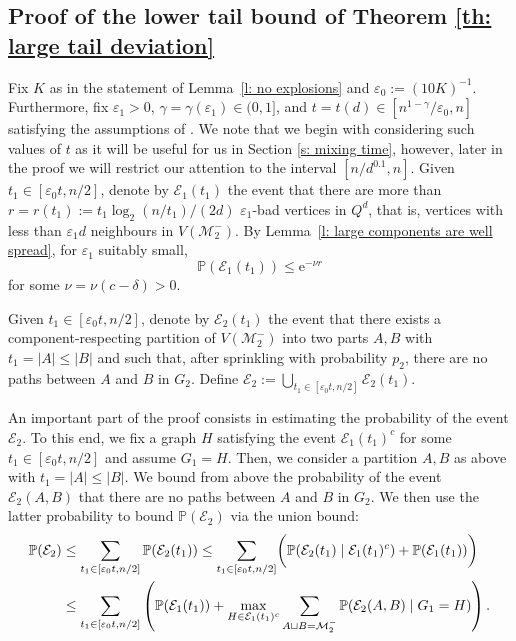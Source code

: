\documentclass[reqno,final,a4paper]{amsart}
\theoremstyle{definition}
\newcommand{\cE}{\mathcal{E}}
\newcommand{\cM}{\mathcal{M}}
\def\e{\mathrm{e}}
\def\eps{\varepsilon}
\newcommand{\1}{\mathbbm{1}}
\begin{document}
\subsection{Proof of the lower tail bound of Theorem \ref{th: large tail deviation}}\label{subsec: lower bound proof}
Fix $K$ as in the statement of Lemma~\ref{l: no explosions} and $\eps_0 := (10K)^{-1}$.
Furthermore, fix $\eps_1>0$, $\gamma=\gamma(\eps_1)\in (0,1]$, and $t=t(d)\in [n^{1-\gamma}/\eps_0,n]$ satisfying the assumptions of . We note that we begin with considering such values of $t$ as it will be useful for us in Section \ref{s: mixing time}, however, later in the proof we will restrict our attention to the interval $[n/d^{0.1},n]$.
Given $t_1\in [\varepsilon_0 t,n/2]$, denote by $\cE_1(t_1)$ the event that there are more than $r=r(t_1):=t_1 \log_2(n/t_1)/(2d)$ $\eps_1$-bad vertices in $Q^d$, that is, vertices with less than $\eps_1 d$ neighbours in $V(\cM_2^-)$.
By Lemma~\ref{l: large components are well spread}, for $\eps_1$ suitably small, 
\begin{equation}
\label{eq:E_1_t_1}
\mathbb P(\cE_1(t_1))\le \e^{-\nu r}
\end{equation}
for some $\nu=\nu(c-\delta)>0$.

Given $t_1\in [\varepsilon_0 t,n/2]$, denote by $\cE_2(t_1)$ the event that 
there exists a component-respecting partition of $V(\cM_2^-)$ into two parts $A,B$ with $t_1=|A|\le |B|$ and such that, 
after sprinkling with probability $p_2$, there are no paths between $A$ and $B$ in $G_2$. Define $\cE_2:=\bigcup_{t_1\in [\eps_0 t,n/2]} \cE_2(t_1)$.

An important part of the proof consists in estimating the probability of the event $\cE_2$.
To this end, we fix a graph $H$ satisfying the event $\mathcal{E}_1(t_1)^c$ for some $t_1\in [\eps_0t,n/2]$ and assume $G_1=H$. 
Then, we consider a partition $A,B$ as above with $t_1=|A|\leq |B|$. We bound from above the probability of the event $\mathcal{E}_2(A,B)$ that there are no paths between $A$ and $B$ in $G_2$. 
We then use the latter probability to bound $\mathbb{P}(\mathcal{E}_2)$ via the union bound:
\begin{align}
\label{eq:E_2-union_bound}
 \mathbb{P}(\mathcal{E}_2)&\leq\sum_{t_1\in [\eps_0t,n/2]}\mathbb{P}(\mathcal{E}_2(t_1))\leq
 \sum_{t_1\in [\eps_0t,n/2]}\biggl(\mathbb{P}(\mathcal{E}_2(t_1)\mid\cE_1(t_1)^c)+\mathbb{P}(\cE_1(t_1))\biggr)\notag\\ 
 &\leq\sum_{t_1\in [\eps_0t,n/2]}\left(\mathbb{P}(\cE_1(t_1))+\max_{H\in\cE_1(t_1)^c}\sum_{A\sqcup B=\cM_2^-}\mathbb{P}(\mathcal{E}_2(A,B)\mid G_1=H)\right).
\end{align}
\end{document}
